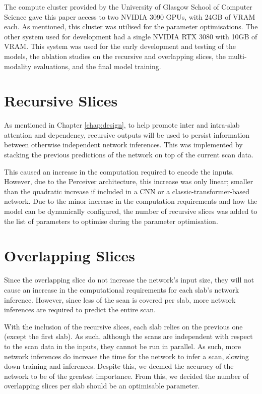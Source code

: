 \documentclass{l4proj}
\begin{document}
The compute cluster provided by the University of Glasgow School of Computer Science gave this paper access to two NVIDIA 3090 GPUs, with 24GB of VRAM each. As mentioned, this cluster was utilised for the parameter optimisations. The other system used for development had a single NVIDIA RTX 3080 with 10GB of VRAM. This system was used for the early development and testing of the models, the ablation studies on the recursive and overlapping slices, the multi-modality evaluations, and the final model training.

\section{Recursive Slices}

As mentioned in Chapter \ref{chap:design}, to help promote inter and intra-slab attention and dependency, recursive outputs will be used to persist information between otherwise independent network inferences. This was implemented by stacking the previous predictions of the network on top of the current scan data.

This caused an increase in the computation required to encode the inputs. However, due to the Perceiver architecture, this increase was only linear; smaller than the quadratic increase if included in a CNN or a classic-transformer-based network. Due to the minor increase in the computation requirements and how the model can be dynamically configured, the number of recursive slices was added to the list of parameters to optimise during the parameter optimisation.

\section{Overlapping Slices}

Since the overlapping slice do not increase the network’s input size, they will not cause an increase in the computational requirements for each slab’s network inference. However, since less of the scan is covered per slab, more network inferences are required to predict the entire scan.

With the inclusion of the recursive slices, each slab relies on the previous one (except the first slab). As such, although the scans are independent with respect to the scan data in the inputs, they cannot be run in parallel. As such, more network inferences do increase the time for the network to infer a scan, slowing down training and inferences. Despite this, we deemed the accuracy of the network to be of the greatest importance. From this, we decided the number of overlapping slices per slab should be an optimisable parameter.
\end{document}
